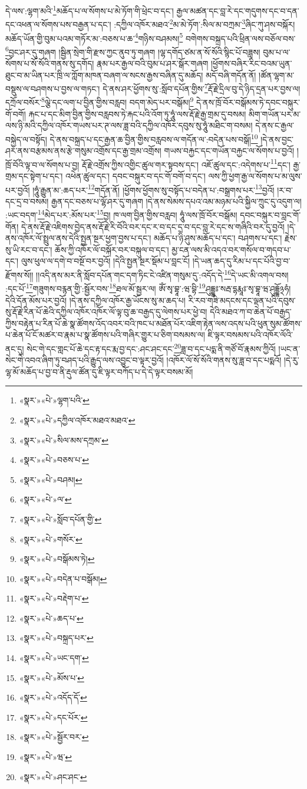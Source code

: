 དེ་ལས་:ལྷག་མའི་\footnote{«སྣར་»«པེ་»ལྷག་པའི་}མཆོད་པ་ལ་སོགས་པ་མེ་ཏོག་གི་ཕྲེང་བ་དང་། རྒྱལ་མཚན་དང་བླ་རེ་དང་གདུགས་དང་བ་དན་དང་འཕན་ལ་སོགས་པས་བརྒྱན་པ་དང་། :དཀྱིལ་འཁོར་མཐའ་\footnote{«སྣར་»«པེ་»དཀྱིལ་འཁོར་མཐའ་མཐའ་}མ་མེ་ཏོག་:སིལ་མ་བཀྲམ་\footnote{«སྣར་»«པེ་»སིལ་མས་དཀྲམ་}ཞིང་ཀུ་ཤས་བསྐོར། མཆོད་ཡོན་གྱི་བུམ་པའམ་གཏོར་མ་:བཅས་པ་ཆ་\footnote{«སྣར་»«པེ་»བཅས་པ་}གཉིས་བཤམས།\footnote{«སྣར་»«པེ་»བཤམ།} བགེགས་བསྐྲད་པའི་ཕྲིན་ལས་བཅོལ་བས་\footnote{«སྣར་»«པེ་»ལ་}བྱང་ཤར་དུ་གཞག །སྦྱིན་སྲེག་གི་རྫས་ཀྱང་ནུབ་ཏུ་གཞག །ལྷ་དགོད་ཙམ་ན་སོ་སོའི་སྙིང་པོ་བཟླས། བུམ་པ་ལ་སོགས་པ་སོ་སོའི་གནས་སུ་དགོད། རྣམ་པར་རྒྱལ་བའི་བུམ་པ་ཤར་སྒོར་གཞག །ཕྱོགས་བཞིར་རིང་བའམ་ཡུན་ཐུང་བ་མ་ཡིན་པར་ཁྲི་ལ་ཀློག་མཁན་བཞག་ལ་སངས་རྒྱས་བཞིན་དུ་མཆོད། མདོ་བཞི་གདོན་ནོ། །ཚོན་ལྷག་མ་བསྡུས་ལ་བཤགས་པ་བྱས་ལ་གཏང་། དེ་ནས་ཤར་ཕྱོགས་སུ་:སློབ་དཔོན་གྱིས་\footnote{«སྣར་»«པེ་»སློབ་དཔོན་གྱི་}རྡོ་རྗེ་དྲིལ་བུ་དེ་ཉིད་དྲན་པར་བྱས་ལ། དཀྲོལ་བསོར་\footnote{«སྣར་»«པེ་»གསོར་}ལྕེ་དང་ལག་པ་བྱིན་གྱིས་བརླབ། བདག་མེད་པར་བསྒོམ།\footnote{«སྣར་»«པེ་»བསྒོམས་ཏེ།} དེ་ནས་ཁྲོ་བོར་བསྒོམས་ཏེ་དབང་བསྐུར་གོ་བགོ། རྐང་པ་དང་མིག་བྱིན་གྱིས་བརླབས་ཏེ་རྐང་པའི་འོག་ཏུ་ཧཱུཾ་ལས་རྡོ་རྗེ་རྒྱ་གྲམ་དུ་བསམ། མིག་གཡོན་པར་མ་ལས་ཉི་མའི་དཀྱིལ་འཁོར་གཡས་པར་ཊ་ལས་ཟླ་བའི་དཀྱིལ་འཁོར་དབུས་སུ་ཧཱུཾ་མཐིང་ག་བསམ། དེ་ནས་ང་རྒྱལ་བསྐྱེད་ལ་བསྟོད། དེ་ནས་བསྐྲད་པ་དང་རྒྱན་ཆ་བྱིན་གྱིས་བརླབས་ལ་གདོན་ལ་:བདེན་པས་བསྒོ།\footnote{«སྣར་»«པེ་»བདེན་པ་བསྒོམ།} །དེ་ནས་བྱང་ཤར་ནས་བརྩམས་ནས་རྩེ་གསུམ་འགྲོས་དང་རྒྱ་གྲམ་འགྲོས། གཡས་བརྐྱང་དང་གཡོན་བརྐྱང་ལ་སོགས་པ་བྱའོ། །ཁྲོ་བོའི་ལྟ་བ་ལ་སོགས་པ་བྱ། རྡོ་རྗེ་འགྲོས་ཀྱིས་འགྱིང་ཚུལ་གར་སྟབས་དང་། འཇོ་ཚུལ་དང་:འདེགས་པ་\footnote{«སྣར་»«པེ་»བརྡེག་པ་}དང་། རྒྱ་གྲམ་དང་སྟེག་པ་དང་། འཕེན་ཚུལ་དང་། དབང་བསྐུར་བ་དང་གོ་བགོ་བ་དང་། ལས་ཀྱི་ཕྱག་རྒྱ་ལ་སོགས་པ་མ་ལུས་པར་བྱའོ། །ཧཱུཾ་རྒྱུན་མ་:ཆད་པར་\footnote{«སྣར་»«པེ་»ཆད་པ་}གདོན་ནོ། །ཕྱོགས་ཕྱོགས་སུ་བསྟོད་པ་བདེན་པ་:བསྒྲགས་པར་\footnote{«སྣར་»«པེ་»བསྐྲད་པར་}བྱའོ། །ར་བ་དང་དྲ་བ་བསམ། རྒྱན་དང་བཅས་པ་ལྷོ་ཤར་དུ་གཞག །དེ་ནས་སེམས་དཔའ་འམ་མཉམ་པའི་སྐྱིལ་ཀྲུང་དུ་འདུག་ལ། :ཡང་བདག་\footnote{«སྣར་»«པེ་»ཡང་དག་}མེད་པར་:མོས་པར་\footnote{«སྣར་»«པེ་»མོས་པ་}བྱ། ཁ་ལག་བྱིན་གྱིས་བརླབ། ཧཱུཾ་ལས་ཁྲོ་བོར་བསྒོམ། དབང་བསྐུར་བ་བླང་གོ་གོན། དེ་ནས་རྡོ་རྗེ་འཇིགས་བྱེད་ནས་རྡོ་རྗེ་རི་བོའི་བར་དང་ར་བ་དང་དྲ་བ་དང་བླ་རེ་དང་ས་གཞིའི་བར་དུ་བྱའོ། །དེ་ནས་འཁོར་ལོ་སྤྲུལ་ནས་དེའི་སྤྱན་སྔར་ཕྱག་བྱས་པ་དང་། མཆོད་པ་ཉི་ཤུས་མཆོད་པ་དང་། བཤགས་པ་དང་། རྗེས་སུ་ཡི་རང་བ་དང་། ཆོས་ཀྱི་འཁོར་ལོ་བསྐོར་བར་བསྐུལ་བ་དང་། མྱ་ངན་ལས་མི་འདའ་བར་གསོལ་བ་གདབ་པ་དང་། ལུས་ཕུལ་ལ་དགེ་བ་བསྔོ་བར་བྱའོ། །དེའི་སྤྱན་སྔར་སྡོམ་པ་བླང་ངོ། །དེ་ཡན་ཆད་དུ་རིམ་པ་དང་པོའི་བྱ་བ་རྫོགས་སོ།། །།འདི་ནས་མར་ནི་སློབ་དཔོན་གང་དག་ཏིང་ངེ་འཛིན་གསུམ་དུ་:འདོད་དེ་\footnote{«སྣར་»«པེ་»འདོད་དོ་}དེ་ཡང་མི་འགལ་བས། :དང་པོ་\footnote{«སྣར་»«པེ་»དང་པོར་}གཟུགས་བརྙན་གྱི་:སྦྱོར་བས་\footnote{«སྣར་»«པེ་»སྦྱོར་བར་}ཐལ་མོ་སྦྱར་ལ། ཨོཾ་སྭ་བྷཱ་:ཝ་བྷི་\footnote{«སྣར་»«པེ་»ཝ་}ཤུདྡྷཿ་སརྦ་དྷརྨཱཿ་སྭ་བྷཱ་ཝ་ཤུདྡྷོ྅ཧཾ། དེའི་དོན་མོས་པར་བྱའོ། །དེ་ནས་དཀྱིལ་འཁོར་རྒྱ་ཡོངས་སུ་མ་ཆད་པ། རི་རབ་གཟི་མདངས་དང་ལྡན་པའི་དབུས་སུ་རྡོ་རྗེ་རིན་པོ་ཆེའི་དཀྱིལ་འཁོར་འཁོར་ལོ་ལྟ་བུ་ཆ་བརྒྱད་དུ་ལེགས་པར་ཕྱེ་བ། དེའི་མཐའ་ཀ་བ་ཆེན་པོ་བརྒྱད་ཀྱིས་བརྟེན་པ་རིན་པོ་ཆེ་སྣ་ཚོགས་འོད་འབར་བའི་ཁང་པ་མཐོན་པོར་འཇིག་རྟེན་ལས་འདས་པའི་ཕུན་སུམ་ཚོགས་པ་ཆེན་པོ་ངོ་མཚར་བ་རྣམ་པ་སྣ་ཚོགས་པའི་གཞིར་གྱུར་པ་ཅིག་བསམས་ལ། ཇི་ལྟར་བསམས་པའི་འཁོར་ལོའི་ནང་དུ། སེང་གེ་དང་གླང་པོ་ཆེ་དང་རྟ་དང་རྨ་བྱ་དང་:ཤང་ཤང་དང་\footnote{«སྣར་»«པེ་»ཤང་ཤང་}ཟླ་བ་དང་པདྨ་ནི་གཙོ་བོ་རྣམས་ཀྱིའོ། །ཡང་ན་སེང་གེ་འབའ་ཞིག་ཏུ་བཤད་པའི་རྒྱུད་ལས་འབྱུང་བ་ལྟར་བྱའོ། །འཁོར་ལོ་སོ་སོའི་གནས་སུ་ཟླ་བ་དང་པདྨའོ། །དེ་རུ་ལྷ་མོ་མཆོད་པ་བྱ་བ་ནི་རྡུལ་ཚོན་དུ་ཇི་ལྟར་བཀོད་པ་དེ་དེ་ལྟར་བསམ་མོ། 